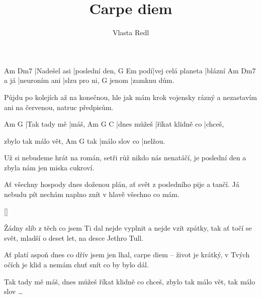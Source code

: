 \documentclass{song}
\title{Carpe diem}
\author{Vlasta Redl}
\begin{document}
\strophe
Am           Dm7
|Nadešel asi |poslední den,
    G                 Em
podí|vej celá planeta |blázní
     Am            Dm7     
a já |neuroním ani |slzu pro ni,
      G
jenom |zamknu dům.
\endstrophe

\strophe*
Půjdu po kolejích až na konečnou,
hle jak mám krok vojensky rázný
a nezastavím ani na červenou,
natruc předpisům.
\endstrophe

Am           G
|Tak tady mě |máš,
Am          G                C
|dnes můžeš |říkat klidně co |chceš,

zbylo tak málo vět,
    Am            G
tak |málo slov co |nelžou.
\endstrophe

\strophe*
Už si nebudeme hrát na román,
setři růž nikdo nás nenatáčí,
je poslední den a zbyla nám jen
miska cukroví.
\endstrophe

\strophe*
Ať všechny hospody dnes doženou plán,
ať svět z posledního pije a tančí.
Já nebudu pít nechám naplno znít
v hlavě všechno co mám.
\endstrophe

\ref{}

\strophe*
Žádny slib z těch co jsem Ti dal
nejde vyplnit a nejde vzít zpátky,
tak ať točí se svět, mladší o deset let,
na desce Jethro Tull.
\endstrophe

\strophe*
Ať platí aspoň dnes co dřív jsem jen lhal,
carpe diem -- život je krátký,
v Tvých očích je klid
a nemám chuť snít co by bylo dál.
\endstrophe

Tak tady mě máš,
dnes můžeš říkat klidně co chceš,
zbylo tak málo vět, tak málo slov \ldots
\endstrophe
\end{document}
